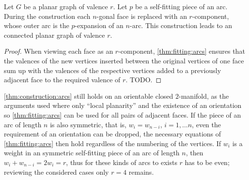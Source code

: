 \begin{construction}\label{thm:construction:arcs} Let $G$ be a planar graph of valence $r$. Let $p$ be a self-fitting piece of an arc. During the construction each $n$-gonal face is replaced with an $r$-component, whose outer arc is the $p$-expansion of an $n$-arc. This construction leads to an connected planar graph of valence $r$.
  \begin{proof}
    When viewing each face as an $r$-component, \autoref{thm:fitting:arcs} ensures that the valences of the new vertices inserted between the original vertices of one face sum up with the valences of the respective vertices added to a previously adjacent face to the required valence of $r$. TODO.
  \end{proof}
\end{construction}

\begin{remark}
  \autoref{thm:construction:arcs} still holds on an orientable closed $2$-manifold, as the arguments used where only ``local planarity'' and the existence of an orientation so \autoref{thm:fitting:arcs} can be used for all pairs of adjacent faces. If the piece of an arc of length $n$ is also symmetric, that is, $w_i = w_{n-i}$, $i = 1, \dots n$, even the requirement of an orientation can be dropped, the necessary equations of \autoref{thm:fitting:arcs} then hold regardless of the numbering of the vertices. If $w_i$ is a weight in an symmetric self-fitting piece of an arc of length $n$, then $w_i + w_{n-i} = 2 w_i = r$, thus for these kinds of arcs to exists $r$ has to be even; reviewing the considered cases only $r = 4$ remains.
\end{remark}
